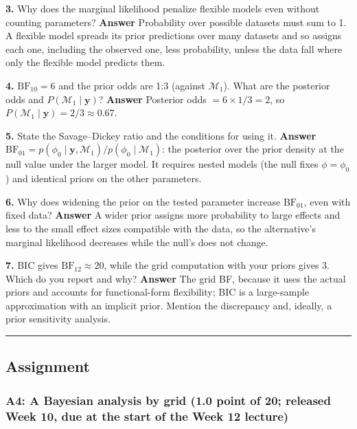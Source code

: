 \textbf{3.} Why does the marginal likelihood penalize flexible models
even without counting parameters? \textbf{Answer} Probability over
possible datasets must sum to 1. A flexible model spreads its prior
predictions over many datasets and so assigns each one, including the
observed one, less probability, unless the data fall where only the
flexible model predicts them.

\textbf{4.} \(\mathrm{BF}_{10} = 6\) and the prior odds are 1:3 (against
\(\mathcal{M}_1\)). What are the posterior odds and
\(P(\mathcal{M}_1\mid\mathbf{y})\)? \textbf{Answer} Posterior odds
\(= 6 \times 1/3 = 2\), so
\(P(\mathcal{M}_1\mid\mathbf{y}) = 2/3 \approx 0.67\).

\textbf{5.} State the Savage--Dickey ratio and the conditions for using
it. \textbf{Answer}
\(\mathrm{BF}_{01} = p(\phi_0\mid\mathbf{y},\mathcal{M}_1)/p(\phi_0\mid\mathcal{M}_1)\):
the posterior over the prior density at the null value under the larger
model. It requires nested models (the null fixes \(\phi = \phi_0\)) and
identical priors on the other parameters.

\textbf{6.} Why does widening the prior on the tested parameter increase
\(\mathrm{BF}_{01}\), even with fixed data? \textbf{Answer} A wider
prior assigns more probability to large effects and less to the small
effect sizes compatible with the data, so the alternative's marginal
likelihood decreases while the null's does not change.

\textbf{7.} BIC gives \(\mathrm{BF}_{12} \approx 20\), while the grid
computation with your priors gives 3. Which do you report and why?
\textbf{Answer} The grid BF, because it uses the actual priors and
accounts for functional-form flexibility; BIC is a large-sample
approximation with an implicit prior. Mention the discrepancy and,
ideally, a prior sensitivity analysis.

\begin{center}\rule{0.5\linewidth}{0.5pt}\end{center}


\subsection{Assignment}

\subsubsection{A4: A Bayesian analysis by grid (1.0 point of 20;
released Week 10, due at the start of the Week 12 lecture)}

